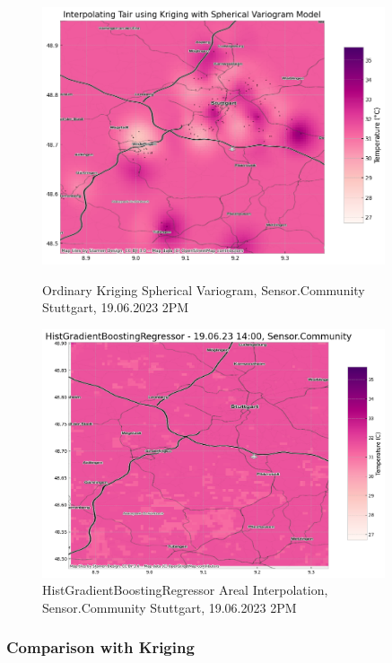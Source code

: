 \begin{figure}[htp]
    \centering
    \includegraphics[width=0.9\textwidth]{images/eval areal interpolation ok stuttgart 14h.png}
    \caption{Ordinary Kriging Spherical Variogram, Sensor.Community Stuttgart, 19.06.2023 2PM}
    \label{fig:eval areal interpolation ok 14h stuttgart}

    \includegraphics[width=0.9\textwidth]{images/eval areal interpolation hgb 14h.png}
    \caption{HistGradientBoostingRegressor Areal Interpolation, Sensor.Community Stuttgart, 19.06.2023 2PM}
    \label{fig:eval areal interpolation hgb 14h stuttgart}
\end{figure}

\subsubsection{Comparison with Kriging}


